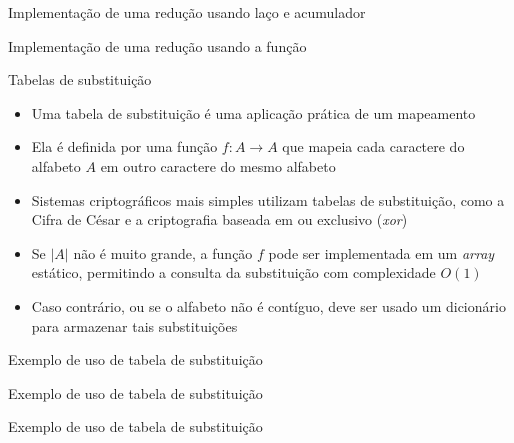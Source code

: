 \begin{frame}[fragile]{Implementação de uma redução usando laço e acumulador}
\end{frame}

\begin{frame}[fragile]{Implementação de uma redução usando a função }
\end{frame}

\begin{frame}[fragile]{Tabelas de substituição}

    \begin{itemize}
        \item Uma tabela de substituição é uma aplicação prática de um mapeamento
        \pause

        \item Ela é definida por uma função $f: A \to A$ que mapeia cada caractere do alfabeto 
            $A$ em outro caractere do mesmo alfabeto
        \pause

        \item Sistemas criptográficos mais simples utilizam tabelas de substituição, como a Cifra 
            de César e a criptografia baseada em ou exclusivo (\textit{xor})
        \pause

        \item Se $|A|$ não é muito grande, a função $f$ pode ser implementada em um \textit{array}
            estático, permitindo a consulta da substituição com complexidade $O(1)$
        \pause

        \item Caso contrário, ou se o alfabeto não é contíguo, deve ser usado um dicionário para 
            armazenar tais substituições
            
    \end{itemize}

\end{frame}

\begin{frame}[fragile]{Exemplo de uso de tabela de substituição}
\end{frame}

\begin{frame}[fragile]{Exemplo de uso de tabela de substituição}
\end{frame}

\begin{frame}[fragile]{Exemplo de uso de tabela de substituição}
\end{frame}
